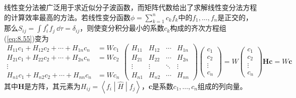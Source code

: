     线性变分法被广泛用于求近似分子波函数，而矩阵代数给出了求解线性变分法方程的计算效率最高的方法。若线性变分函数$\phi = \sum_{k=1}^{n}c_kf_k$中的$f_1,\ldots,f_n$是正交的，那么$S_{ij} = \int f_i^{\ast}f_j\:\dd \tau = \delta_{ij}$，则使变分积分最小的系数$c_k$构成的齐次方程组(\ref{eq:8.55})变为
    \begin{subequations}
        \label{eq:8.79}
        \begin{equation}
            \begin{aligned}
                H_{11}c_1 + H_{12}c_2 + \cdots + H_{1n}c_n &= Wc_1 \\
                H_{21}c_1 + H_{22}c_2 + \cdots + H_{2n}c_n &= Wc_2 \\
                \vdots \\
                H_{n1}c_1 + H_{n2}c_2 + \cdots + H_{nn}c_n &= Wc_n
            \end{aligned}
            \tag{8.79a}
            \label{eq:8.79a}
        \end{equation}
        \begin{equation}
            \begin{pmatrix}
                H_{11} & H_{12} & \cdots & H_{1n} \\
                H_{21} & H_{22}& \cdots & H_{2n} \\
                \vdots & \vdots & \ddots & \vdots \\
                H_{n1} & H_{n2} & \cdots & H_{nn}
            \end{pmatrix} \begin{pmatrix}
                c_1 \\
                c_2 \\
                \vdots \\
                c_n
            \end{pmatrix} = W\begin{pmatrix}
                c_1 \\
                c_2 \\
                \vdots \\
                c_n
            \end{pmatrix}
            \tag{8.79b}
            \label{eq:8.79b}
        \end{equation}
        \begin{equation}
            \mathbf{H}\mathbf{c} = W\mathbf{c}
            \tag{8.79c}
            \label{eq:8.79c}
        \end{equation}
    \end{subequations}
    其中$\mathbf{H}$是方阵，其元素为$H_{ij} = \left\langle f_i \middle| \hat{H} \middle| f_j \right\rangle$，$\mathbf{c}$是系数$c_1,\ldots,c_n$组成的列向量。

